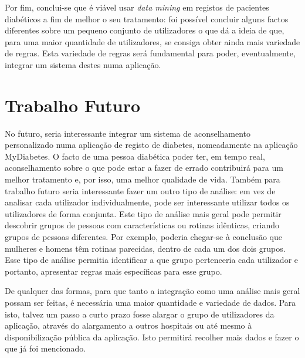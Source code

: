 Por fim, conclui-se que é viável usar \textit{data mining} em registos de pacientes diabéticos a fim de melhor o seu tratamento: foi possível concluir alguns factos diferentes sobre um pequeno conjunto de utilizadores o que dá a ideia de que, para uma maior quantidade de utilizadores, se consiga obter ainda mais variedade de regras. Esta variedade de regras será fundamental para poder, eventualmente, integrar um sistema destes numa aplicação.





\section{Trabalho Futuro}\label{sec:trab}

No futuro, seria interessante integrar um sistema de aconselhamento personalizado numa aplicação de registo de diabetes, nomeadamente na aplicação MyDiabetes. O facto de uma pessoa diabética poder ter, em tempo real, aconselhamento sobre o que pode estar a fazer de errado contribuirá para um melhor tratamento e, por isso, uma melhor qualidade de vida. Também para trabalho futuro seria interessante fazer um outro tipo de análise: em vez de analisar cada utilizador individualmente, pode ser interessante utilizar todos os utilizadores de forma conjunta. Este tipo de análise mais geral pode permitir descobrir grupos de pessoas com características ou rotinas idênticas, criando grupos de pessoas diferentes. Por exemplo, poderia chegar-se à conclusão que mulheres e homens têm rotinas parecidas, dentro de cada um dos dois grupos. Esse tipo de análise permitia identificar a que grupo pertenceria cada utilizador e portanto, apresentar regras mais específicas para esse grupo. 

De qualquer das formas, para que tanto a integração como uma análise mais geral possam ser feitas, é necessária uma maior quantidade e variedade de dados. Para isto, talvez um passo a curto prazo fosse alargar o grupo de utilizadores da aplicação, através do alargamento a outros hospitais ou até mesmo à disponibilização pública da aplicação. Isto permitirá recolher mais dados e fazer o que já foi mencionado.
